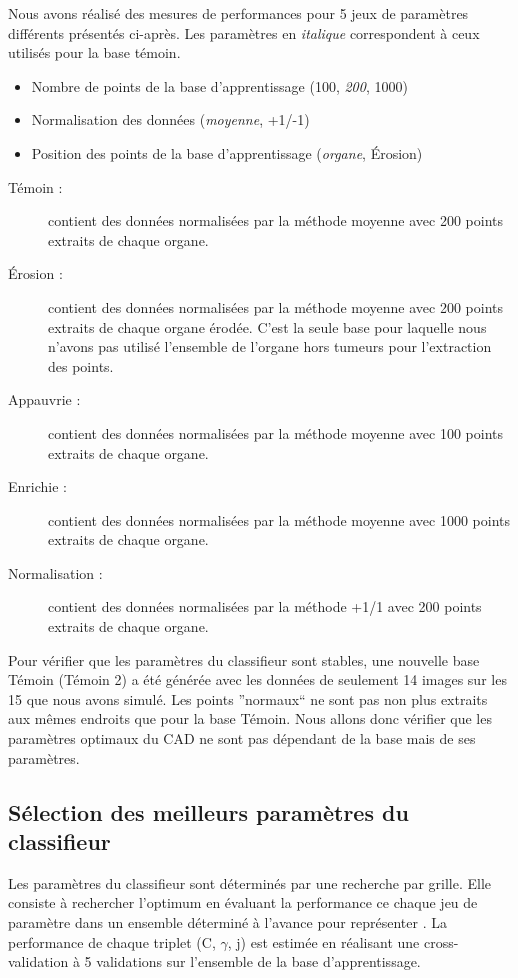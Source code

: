 Nous avons réalisé des mesures de performances pour 5 jeux de paramètres différents présentés ci-après. Les paramètres en \emph{italique} correspondent à ceux utilisés pour la base témoin.


\begin{itemize}
 \item Nombre de points de la base d'apprentissage (100, \emph{200}, 1000)
 \item Normalisation des données (\emph{moyenne}, +1/-1)
 \item Position des points de la base d'apprentissage (\emph{organe}, Érosion)
\end{itemize}


\begin{description}
 \item[Témoin : ] contient des données normalisées par la méthode moyenne avec 200 points extraits de chaque organe.
 \item[\'Erosion : ] contient des données normalisées par la méthode moyenne avec 200 points extraits de chaque organe érodée. C'est la seule base pour laquelle nous n'avons pas utilisé l'ensemble de l'organe hors tumeurs pour l'extraction des points.
 \item[Appauvrie : ] contient des données normalisées par la méthode moyenne avec 100 points extraits de chaque organe.
 \item[Enrichie : ] contient des données normalisées par la méthode moyenne avec 1000 points extraits de chaque organe.
 \item[Normalisation : ] contient des données normalisées par la méthode +1/1 avec 200 points extraits de chaque organe.
\end{description}

Pour vérifier que les paramètres du classifieur sont stables, une nouvelle base Témoin (Témoin 2) a été générée avec les données de seulement 14 images sur les 15 que nous avons simulé. Les points ''normaux`` ne sont pas non plus extraits aux mêmes endroits que pour la base Témoin. Nous allons donc vérifier que les paramètres optimaux du CAD ne sont pas dépendant de la base mais de ses paramètres.


\subsection{Sélection des meilleurs paramètres du classifieur}

Les paramètres du classifieur sont déterminés par une recherche par grille. Elle consiste à rechercher l'optimum en évaluant la performance ce chaque jeu de paramètre dans un ensemble déterminé à l'avance pour représenter . La performance de chaque triplet (C, $\gamma$, j) est estimée en réalisant une cross-validation à 5 validations sur l'ensemble de la base d'apprentissage.



